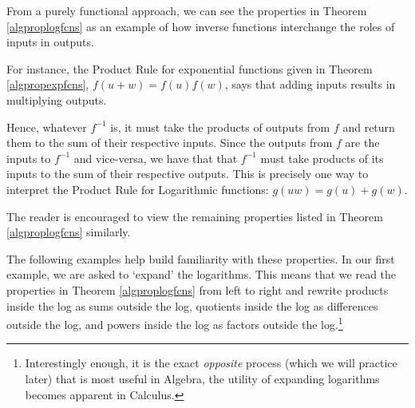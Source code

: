 \documentclass{ximera}
\begin{document}
\smallskip

From a purely functional approach, we can see the properties in Theorem \ref{algproplogfcns} as an example of how inverse functions interchange the roles of inputs in outputs.  

\smallskip

For instance, the Product Rule for exponential functions given in Theorem  \ref{algpropexpfcns}, $f(u+w) = f(u)f(w)$, says that adding inputs results in multiplying outputs.   

\smallskip

Hence, whatever $f^{-1}$ is, it must take the products of outputs from $f$ and return them to the sum of their respective inputs.  Since the outputs from $f$ are the inputs to $f^{-1}$ and vice-versa, we have that that $f^{-1}$ must take products of its inputs to the sum of their respective outputs. This is precisely one way to interpret the Product Rule for Logarithmic functions:  $g(uw) = g(u) + g(w)$.  

\smallskip

The reader is encouraged to view the remaining properties listed in Theorem \ref{algproplogfcns} similarly.  

\smallskip

The following examples help build familiarity with these properties.  In our first example, we are asked to `expand' the logarithms.  This means that we read the properties in Theorem \ref{algproplogfcns} from left to right and rewrite products inside the log as sums outside the log, quotients inside the log as  differences outside the log, and powers inside the log as factors outside the log.\footnote{Interestingly enough, it is the exact \textit{opposite} process (which we will practice later) that is most useful in Algebra, the utility of expanding logarithms becomes apparent in Calculus.}

\smallskip
\end{document}
